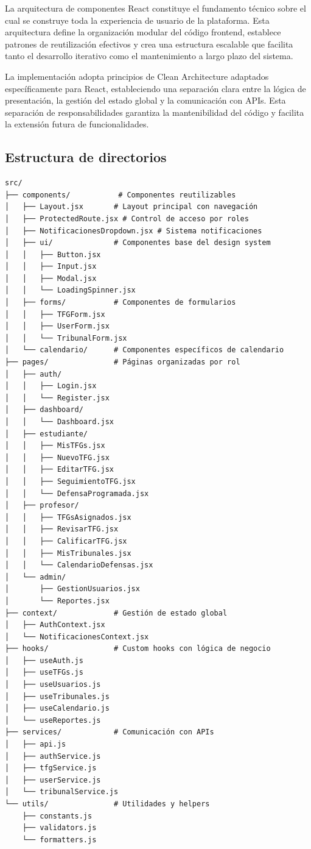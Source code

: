 \documentclass[12pt,a4paper,oneside]{report}
\begin{document}
La arquitectura de componentes React constituye el fundamento técnico sobre el cual se construye toda la experiencia de usuario de la plataforma. Esta arquitectura define la organización modular del código frontend, establece patrones de reutilización efectivos y crea una estructura escalable que facilita tanto el desarrollo iterativo como el mantenimiento a largo plazo del sistema.

La implementación adopta principios de Clean Architecture adaptados específicamente para React, estableciendo una separación clara entre la lógica de presentación, la gestión del estado global y la comunicación con APIs. Esta separación de responsabilidades garantiza la mantenibilidad del código y facilita la extensión futura de funcionalidades.

\subsection{Estructura de directorios}\label{estructura-de-directorios}

\begin{lstlisting}
src/
├── components/           # Componentes reutilizables
│   ├── Layout.jsx       # Layout principal con navegación
│   ├── ProtectedRoute.jsx # Control de acceso por roles
│   ├── NotificacionesDropdown.jsx # Sistema notificaciones
│   ├── ui/              # Componentes base del design system
│   │   ├── Button.jsx
│   │   ├── Input.jsx
│   │   ├── Modal.jsx
│   │   └── LoadingSpinner.jsx
│   ├── forms/           # Componentes de formularios
│   │   ├── TFGForm.jsx
│   │   ├── UserForm.jsx
│   │   └── TribunalForm.jsx
│   └── calendario/      # Componentes específicos de calendario
├── pages/               # Páginas organizadas por rol
│   ├── auth/
│   │   ├── Login.jsx
│   │   └── Register.jsx
│   ├── dashboard/
│   │   └── Dashboard.jsx
│   ├── estudiante/
│   │   ├── MisTFGs.jsx
│   │   ├── NuevoTFG.jsx
│   │   ├── EditarTFG.jsx
│   │   ├── SeguimientoTFG.jsx
│   │   └── DefensaProgramada.jsx
│   ├── profesor/
│   │   ├── TFGsAsignados.jsx
│   │   ├── RevisarTFG.jsx
│   │   ├── CalificarTFG.jsx
│   │   ├── MisTribunales.jsx
│   │   └── CalendarioDefensas.jsx
│   └── admin/
│       ├── GestionUsuarios.jsx
│       └── Reportes.jsx
├── context/             # Gestión de estado global
│   ├── AuthContext.jsx
│   └── NotificacionesContext.jsx
├── hooks/               # Custom hooks con lógica de negocio
│   ├── useAuth.js
│   ├── useTFGs.js
│   ├── useUsuarios.js
│   ├── useTribunales.js
│   ├── useCalendario.js
│   └── useReportes.js
├── services/            # Comunicación con APIs
│   ├── api.js
│   ├── authService.js
│   ├── tfgService.js
│   ├── userService.js
│   └── tribunalService.js
└── utils/               # Utilidades y helpers
    ├── constants.js
    ├── validators.js
    └── formatters.js
\end{lstlisting}
\end{document}
